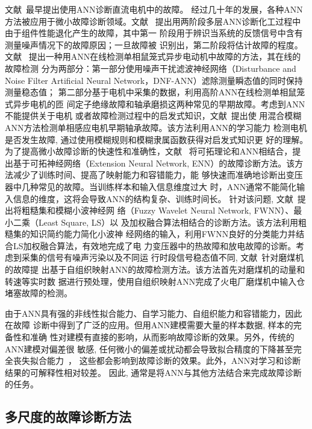 文献~最早提出使用ANN诊断直流电机中的故障。
经过几十年的发展，各种ANN方法被应用于微小故障诊断领域。文献~
提出用两阶段多层ANN诊断化工过程中由于组件性能退化产生的故障，其中第一
阶段用于辨识当系统的反馈信号中含有测量噪声情况下的故障原因；一旦故障被
识别出，第二阶段将估计故障的程度。文献~
提出一种用ANN在线检测单相鼠笼式异步电动机中故障的方法，其在线的故障检测
分为两部分：第一部分使用噪声干扰滤波神经网络（Disturbance and Noise Filter
Artificial Neural Network，DNF-ANN）滤除测量瞬态值的同时保持测量稳态值；
第二部分基于电机中采集的数据，利用高阶ANN在线检测单相鼠笼式异步电机的匝
间定子绝缘故障和轴承磨损这两种常见的早期故障。考虑到ANN不能提供关于电机
或者故障检测过程中的启发式知识，文献~提出使
用混合模糊ANN方法检测单相感应电机早期轴承故障。该方法利用ANN的学习能力
检测电机是否发生故障, 通过使用模糊规则和模糊隶属函数获得对启发式知识更
好的理解。为了提高微小故障诊断的快速性和准确性，文献~
将可拓理论和ANN相结合，提出基于可拓神经网络（Extension Neural Network,
ENN）的故障诊断方法。该方法减少了训练时间、提高了映射能力和容错能力，能
够快速而准确地诊断出变压器中几种常见的故障。当训练样本和输入信息维度过大
时，ANN通常不能简化输入信息的维度，这将会导致ANN的结构复杂、训练时间长。
针对该问题, 文献~提出将粗糙集和模糊小波神经网
络（Fuzzy Wavelet Neural Network, FWNN）、最小二乘（Least Square, LS）以
及加权融合算法相结合的诊断方法。该方法利用粗糙集的知识简约能力简化小波神
经网络的输入，利用FWNN良好的分类能力并结合LS加权融合算法，有效地完成了电
力变压器中的热故障和放电故障的诊断。考虑到采集的信号有噪声污染以及不同运
行时段信号稳态值不同, 文献~针对磨煤机的故障提
出基于自组织映射ANN的故障检测方法。该方法首先对磨煤机的动量和转速等实时数
据进行预处理，使用自组织映射ANN完成了火电厂磨煤机中输入仓堵塞故障的检测。

由于ANN具有强的非线性拟合能力、自学习能力、自组织能力和容错能力，因此在故障
诊断中得到了广泛的应用。但用ANN建模需要大量的样本数据, 样本的完备性和准确
性对建模有直接的影响，从而影响故障诊断的效果。另外，传统的ANN建模对偏差很
敏感, 任何微小的偏差或扰动都会导致拟合精度的下降甚至完全丧失拟合能力~\cite{zhangzhengdao2004ann}，
这些都会影响到故障诊断的效果。此外，ANN对学习和诊断结果的可解释性相对较差。
因此, 通常是将ANN与其他方法结合来完成故障诊断的任务。

\subsection{多尺度的故障诊断方法}

